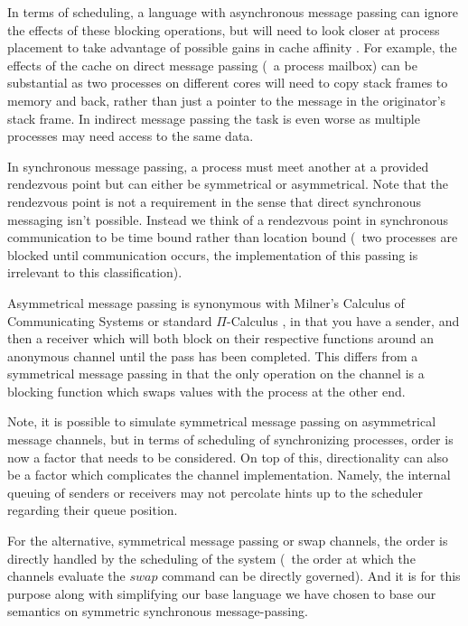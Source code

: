 In terms of scheduling, a language with asynchronous message passing can ignore 
the effects of these blocking operations, but will need to look closer at 
process placement to take advantage of possible gains in cache affinity 
\cite{debattista2002cache}. For example, the effects of the cache on direct 
message passing (\eg~a process mailbox) can be substantial as two processes
on different cores will need to copy stack frames to memory and back, rather 
than just a pointer to the message in the originator's stack frame. In indirect 
message passing the task is even worse as multiple processes may need access to 
the same data.

In synchronous message passing, a process must meet another at a provided 
rendezvous point but can either be symmetrical or asymmetrical. Note that the 
rendezvous point is not a requirement in the sense that direct synchronous 
messaging isn't possible. Instead we think of a rendezvous point in synchronous 
communication to be time bound rather than location bound (\ie~two processes are 
blocked until communication occurs, the implementation of this passing is 
irrelevant to this classification).

Asymmetrical message passing is synonymous with Milner's Calculus of 
Communicating Systems \cite{milner1982calculus} or standard $\Pi$-Calculus 
\cite{palamidessi1997comparing}, in that you have a sender, and then a receiver 
which will both block on their respective functions around an anonymous channel 
until the pass has been completed. This differs from a symmetrical message 
passing in that the only operation on the channel is a blocking function which 
swaps values with the process at the other end.

Note, it is possible to simulate symmetrical message passing on asymmetrical 
message channels, but in terms of scheduling of synchronizing processes, order 
is now a factor that needs to be considered. On top of this, directionality can 
also be a factor which complicates the channel implementation. Namely, the 
internal queuing of senders or receivers may not percolate hints up to the 
scheduler regarding their queue position. 

For the alternative, symmetrical message passing or swap channels, the order is 
directly handled by the scheduling of the system (\ie~the order at which the 
channels evaluate the $swap$ command can be directly governed). And it is for 
this purpose along with simplifying our base language we have chosen to base our
semantics on symmetric synchronous message-passing. 

